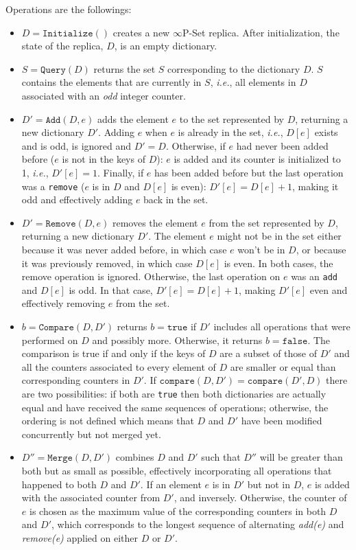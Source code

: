 \documentclass[9pt, oneside]{article}   	%
\begin{document}
Operations are the followings:
\begin{itemize}

	\item $D=\texttt{Initialize}()$ creates a new $\infty$P-Set replica. After initialization, the state of the replica, $D$, is an empty dictionary. 

	\item $S=\texttt{Query}(D)$ returns the set $S$ corresponding to the dictionary $D$. $S$ contains the elements that are currently in $S$, \textit{i.e.}, all elements in $D$ associated with an \textit{odd} integer counter.

	\item $D'=\texttt{Add}(D,e)$ adds the element $e$ to the set represented by $D$, returning a new dictionary $D'$.  Adding $e$ when $e$ is already in the set, \textit{i.e.}, $D[e]$ exists and is odd, is ignored and $D'=D$. Otherwise, if $e$ had never been added before ($e$ is not in the keys of $D$): $e$ is added and its counter is initialized to 1, \textit{i.e.}, $D'[e] = 1$. Finally, if $e$ has been added before but the last operation was a \texttt{remove} ($e$ is in $D$ and $D[e]$ is even): $D'[e] = D[e] + 1$, making it odd and effectively adding $e$ back in the set.

\item $D'=\texttt{Remove}(D, e)$ removes the element $e$ from the set represented by $D$, returning a new dictionary $D'$. The element $e$ might not be in the set either because it was never added before, in which case $e$ won't be in $D$, or because it was previously removed, in which case $D[e]$ is even. In both cases, the remove operation is ignored. Otherwise, the last operation on $e$ was an \texttt{add} and $D[e]$ is odd. In that case, $D'[e]=D[e]+1$, making $D'[e]$ even and effectively removing $e$ from the set.

\item $b=\texttt{Compare}(D, D')$ returns $b=\texttt{true}$ if $D'$ includes all operations that were performed on $D$ and possibly more. Otherwise, it returns $b=\texttt{false}$. The comparison is true if and only if the keys of $D$ are a subset of those of $D'$ and all the counters associated to every element of $D$ are smaller or equal than corresponding counters in $D'$. If $\texttt{compare}(D,D')= \texttt{compare}(D',D)$ there are two possibilities: if both are \texttt{true} then both dictionaries are actually equal and have received the same sequences of operations; otherwise, the ordering is not defined which means that $D$ and $D'$ have been modified concurrently but not merged yet.

\item $D''=\texttt{Merge}(D, D')$ combines $D$ and $D'$ such that $D''$ will be greater than both but as small as possible, effectively incorporating all operations that happened to both $D$ and $D'$. If an element $e$ is  in $D'$ but not in $D$, $e$ is added with the associated counter from $D'$, and inversely. Otherwise, the counter of $e$ is chosen as the maximum value of the corresponding counters in both $D$ and $D'$, which corresponds to the longest sequence of alternating \textit{add(e)} and \textit{remove(e)} applied on either $D$ or $D'$.
\end{itemize}
\end{document}
